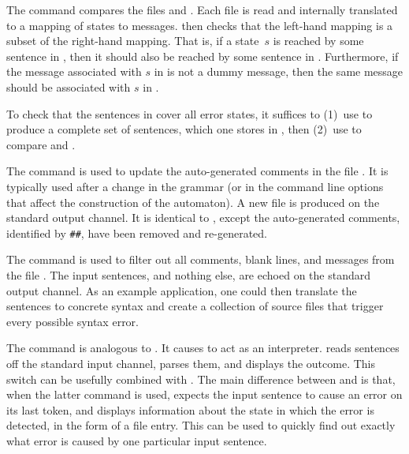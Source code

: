 \documentclass[onecolumn,11pt,nocopyrightspace,preprint]{sigplanconf}
\begin{document}
The command \ocompareerrors {} \ocompareerrors {}
compares the \messages files  and . Each file is
read and internally translated to a mapping of states to messages. \menhir
then checks that the left-hand mapping is a subset of the right-hand mapping.
That is, if a state~$s$ is reached by some sentence in , then it
should also be reached by some sentence in . Furthermore, if the
message associated with $s$ in  is not a dummy message, then the
same message should be associated with $s$ in .

To check that the sentences in  cover all error states, it
suffices to (1)~use \olisterrors to produce a complete set of sentences,
which one stores in , then (2)~use \ocompareerrors to
compare  and .

The command \oupdateerrors {} is used to update the auto-generated
comments in the \messages file . It is typically used after a
change in the grammar (or in the command line options that affect the
construction of the automaton). A new \messages file is produced on the
standard output channel. It is identical to , except the
auto-generated comments, identified by \verb+##+, have been removed and
re-generated.

The command \oechoerrors {} is used to filter out all comments,
blank lines, and messages from the \messages file . The input
sentences, and nothing else, are echoed on the standard output channel. As an
example application, one could then translate the sentences to concrete syntax
and create a collection of source files that trigger every possible syntax
error.

The command \ointerpreterror is analogous to \ointerpret. It causes \menhir to
act as an interpreter. \menhir reads sentences off the standard input channel,
parses them, and displays the outcome. This switch can be usefully combined
with \otrace. The main difference between \ointerpret and \ointerpreterror is
that, when the latter command is used,
\menhir expects the input sentence to cause an error on its last token, and
displays information about the state in which the error is detected, in the
form of a \messages file entry. This can be used to quickly find out exactly
what error is caused by one particular input sentence.

\end{document}
